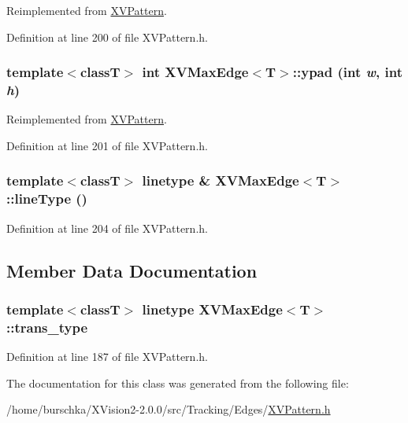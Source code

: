 Reimplemented from \hyperlink{class_XVPattern}{XVPattern}.

Definition at line 200 of file XVPattern.h.\label{XVMaxEdge_a3}
\hypertarget{class_XVMaxEdge_a3}{
\subsubsection[ypad]{\setlength{\rightskip}{0pt plus 5cm}template$<$classT$>$ int XVMax\-Edge$<$T$>$::ypad (int {\em w}, int {\em h})}}




Reimplemented from \hyperlink{class_XVPattern}{XVPattern}.

Definition at line 201 of file XVPattern.h.\label{XVMaxEdge_a5}
\hypertarget{class_XVMaxEdge_a5}{
\subsubsection[lineType]{\setlength{\rightskip}{0pt plus 5cm}template$<$classT$>$ linetype \& XVMax\-Edge$<$T$>$::line\-Type ()}}




Definition at line 204 of file XVPattern.h.

\subsection{Member Data Documentation}
\label{XVMaxEdge_o0}
\hypertarget{class_XVMaxEdge_o0}{
\subsubsection[trans_type]{\setlength{\rightskip}{0pt plus 5cm}template$<$classT$>$ linetype XVMax\-Edge$<$T$>$::trans\_\-type}}




Definition at line 187 of file XVPattern.h.

The documentation for this class was generated from the following file:\begin{CompactItemize}
\item 
/home/burschka/XVision2-2.0.0/src/Tracking/Edges/\hyperlink{XVPattern.h-source}{XVPattern.h}\end{CompactItemize}

